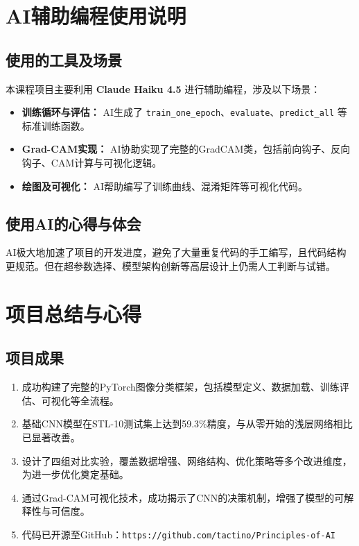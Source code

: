 \documentclass[12pt,a4paper]{ctexart}
\begin{document}
\section{AI辅助编程使用说明}

\subsection{使用的工具及场景}
本课程项目主要利用 \textbf{Claude Haiku 4.5} 进行辅助编程，涉及以下场景：

\begin{itemize}    
    \item \textbf{训练循环与评估：} AI生成了 \texttt{train\_one\_epoch}、\texttt{evaluate}、\texttt{predict\_all} 等标准训练函数。
    
    \item \textbf{Grad-CAM实现：} AI协助实现了完整的GradCAM类，包括前向钩子、反向钩子、CAM计算与可视化逻辑。
    
    \item \textbf{绘图及可视化：} AI帮助编写了训练曲线、混淆矩阵等可视化代码。
\end{itemize}

\subsection{使用AI的心得与体会}
AI极大地加速了项目的开发进度，避免了大量重复代码的手工编写，且代码结构更规范。但在超参数选择、模型架构创新等高层设计上仍需人工判断与试错。

\section{项目总结与心得}

\subsection{项目成果}
\begin{enumerate}
    \item 成功构建了完整的PyTorch图像分类框架，包括模型定义、数据加载、训练评估、可视化等全流程。
    
    \item 基础CNN模型在STL-10测试集上达到59.3\%精度，与从零开始的浅层网络相比已显著改善。
    
    \item 设计了四组对比实验，覆盖数据增强、网络结构、优化策略等多个改进维度，为进一步优化奠定基础。
    
    \item 通过Grad-CAM可视化技术，成功揭示了CNN的决策机制，增强了模型的可解释性与可信度。
    
    \item 代码已开源至GitHub：\texttt{https://github.com/tactino/Principles-of-AI}
\end{enumerate}
\end{document}
